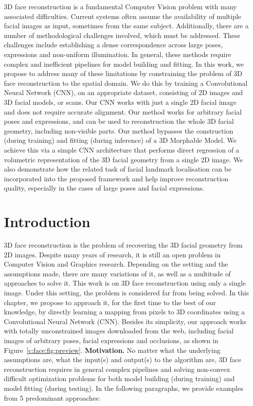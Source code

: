 3D face reconstruction is a fundamental Computer Vision problem with
many associated difficulties. Current systems often assume the
availability of multiple facial images as input, sometimes from the
same subject. Additionally, there are a number of methodological
challenges involved, which must be addressed. These challenges include
establishing a dense correspondence across large poses, expressions
and non-uniform illumination. In general, these methods require
complex and inefficient pipelines for model building and fitting. In
this work, we propose to address many of these limitations by
constraining the problem of 3D face reconstruction to the spatial
domain. We do this by training a Convolutional Neural Network (CNN),
on an appropriate dataset, consisting of 2D images and 3D facial
models, or scans. Our CNN works with just a single 2D facial image and
does not require accurate alignment. Our method works for arbitrary
facial poses and expressions, and can be used to reconstruction the
whole 3D facial geometry, including non-visible parts. Our method
bypasses the construction (during training) and fitting (during
inference) of a 3D Morphable Model. We achieve this via a simple CNN
architecture that performs direct regression of a volumetric
representation of the 3D facial geometry from a single 2D image. We
also demonstrate how the related task of facial landmark localisation
can be incorporated into the proposed framework and help improve
reconstruction quality, especially in the cases of large poses and
facial expressions.


\section{Introduction}
3D face reconstruction is the problem of recovering the 3D facial
geometry from 2D images. Despite many years of research, it is still
an open problem in Computer Vision and Graphics research. Depending on
the setting and the assumptions made, there are many variations of it,
as well as a multitude of approaches to solve it. This work is on 3D
face reconstruction using only a single image. Under this setting, the
problem is considered far from being solved. In this chapter, we
propose to approach it, for the first time to the best of our
knowledge, by directly learning a mapping from pixels to 3D
coordinates using a Convolutional Neural Network (CNN). Besides its
simplicity, our approach works with totally unconstrained images
downloaded from the web, including facial images of arbitrary poses,
facial expressions and occlusions, as shown in
Figure~\ref{c:face:fig:preview}. \newline \textbf{Motivation.} No
matter what the underlying assumptions are, what the input(s) and
output(s) to the algorithm are, 3D face reconstruction requires in
general complex pipelines and solving non-convex difficult
optimization problems for both model building (during training) and
model fitting (during testing). In the following paragraphs, we provide
examples from 5 predominant approaches:

